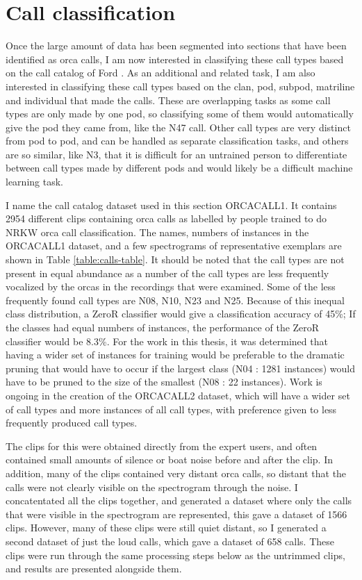 \documentclass[12pt,oneside]{book}
\begin{document}
\section{Call classification}

Once the large amount of data has been segmented into sections that
have been identified as orca calls, I am now interested in
classifying these call types based on the call catalog of Ford
\cite{ford1987catalogue}.  As an additional and related task, I am
also interested in classifying these call types based on the clan, pod,
subpod, matriline and individual that made the calls.  These are
overlapping tasks as some call types are only made by one pod, so
classifying some of them would automatically give the pod they came
from, like the N47 call.  Other call types are very distinct from pod to
pod, and can be handled as separate classification tasks, and others
are so similar, like N3, that it is difficult for an untrained person
to differentiate between call types made by different pods and would likely
be a difficult machine learning task.

I name the call catalog dataset used in this section ORCACALL1.  It
contains 2954 different clips containing orca calls as labelled by
people trained to do NRKW orca call classification.  The names,
numbers of instances in the ORCACALL1 dataset, and a few spectrograms
of representative exemplars are shown in Table
\ref{table:calls-table}.  It should be noted that the call types are
not present in equal abundance as a number of the call types are less
frequently vocalized by the orcas in the recordings that were
examined.  Some of the less frequently found call types are N08, N10,
N23 and N25.  Because of this inequal class distribution, a ZeroR
classifier would give a classification accuracy of 45\%; If the
classes had equal numbers of instances, the performance of the ZeroR
classifier would be 8.3\%.  For the work in this thesis, it was
determined that having a wider set of instances for training would be
preferable to the dramatic pruning that would have to occur if the
largest class (N04 : 1281 instances) would have to be pruned to the
size of the smallest (N08 : 22 instances).  Work is ongoing in the
creation of the ORCACALL2 dataset, which will have a wider set of call
types and more instances of all call types, with preference given to
less frequently produced call types.

The clips for this were obtained directly from the expert users, and
often contained small amounts of silence or boat noise before and
after the clip.  In addition, many of the clips contained very distant
orca calls, so distant that the calls were not clearly visible on the
spectrogram through the noise.  I concatentated all the clips
together, and generated a dataset where only the calls that were
visible in the spectrogram are represented, this gave a dataset of
1566 clips.  However, many of these clips were still quiet distant, so
I generated a second dataset of just the loud calls, which gave a
dataset of 658 calls.  These clips were run through the same
processing steps below as the untrimmed clips, and results are
presented alongside them.
\end{document}
